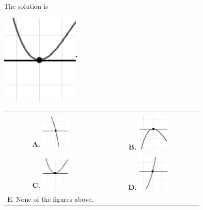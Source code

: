 \documentclass{extbook}[14pt]
\begin{document}
 
 The solution is  
 \begin{center} \includegraphics[width=0.3\textwidth]{../Figures/polyZeroBehaviorCA.png} \end{center}\begin{tabular}{|c|c|} 
\hline 
 & \tabularnewline 
 \textbf{A.} \includegraphics[width=0.3\textwidth]{../Figures/polyZeroBehaviorAA.png} & \textbf{B.} \includegraphics[width=0.3\textwidth]{../Figures/polyZeroBehaviorBA.png} \tabularnewline 
\hline 
 & \tabularnewline 
 \textbf{C.} \includegraphics[width=0.3\textwidth]{../Figures/polyZeroBehaviorCA.png} & \textbf{D.} \includegraphics[width=0.3\textwidth]{../Figures/polyZeroBehaviorDA.png} \tabularnewline 
\hline 
 E. None of the figures above. & \tabularnewline 
\hline 
 \end{tabular} 
 
\end{document}
